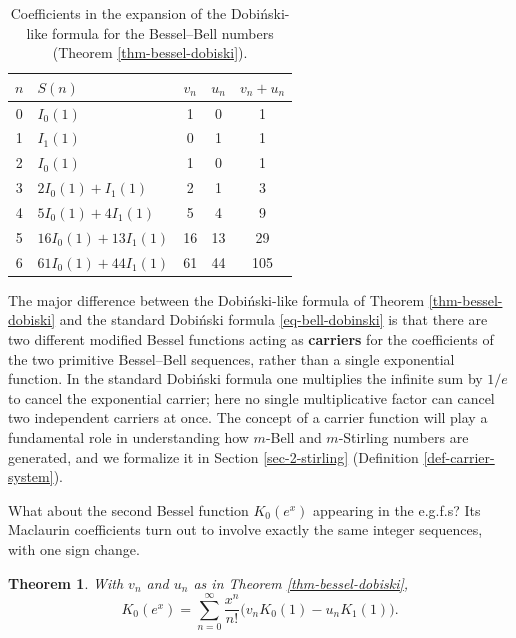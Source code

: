 \documentclass[a4paper]{amsart}
\numberwithin{equation}{section}
\newtheorem{theorem}{Theorem}[section]
\begin{document}
\begin{table}[htbp]
    \centering
        \begin{tabular}{|c|l|c|c|c|}
        \hline
        $n$ & $S(n)$                & $v_n$ & $u_n$ & $v_n+u_n$ \\
        \hline
        0   & $I_0(1)$              & 1     & 0     & 1         \\
        1   & $I_1(1)$              & 0     & 1     & 1         \\
        2   & $I_0(1)$              & 1     & 0     & 1         \\
        3   & $2I_0(1)+I_1(1)$    & 2     & 1     & 3         \\
        4   & $5I_0(1)+4I_1(1)$   & 5     & 4     & 9         \\
        5   & $16I_0(1)+13I_1(1)$ & 16    & 13    & 29        \\
        6   & $61I_0(1)+44I_1(1)$ & 61    & 44 &    105 \\
        \hline
        \end{tabular}
        \bigskip
    \caption{Coefficients in the expansion of the Dobi\'nski-like formula for the Bessel--Bell numbers (Theorem \ref{thm-bessel-dobiski}).}
    \label{tab-vn-un-coefs}
\end{table}

The major difference between the Dobi\'nski-like formula of Theorem \ref{thm-bessel-dobiski} and the standard Dobi\'nski formula \eqref{eq-bell-dobinski} is that there are two different modified Bessel functions acting as \textbf{carriers} for the coefficients of the two primitive Bessel--Bell sequences, rather than a single exponential function. In the standard Dobi\'nski formula one multiplies the infinite sum by $1/e$ to cancel the exponential carrier; here no single multiplicative factor can cancel two independent carriers at once. The concept of a carrier function will play a fundamental role in understanding how $m$-Bell and $m$-Stirling numbers are generated, and we formalize it in Section \ref{sec-2-stirling} (Definition \ref{def-carrier-system}).

What about the second Bessel function $K_0(e^x)$ appearing in the e.g.f.s? Its Maclaurin coefficients turn out to involve exactly the same integer sequences, with one sign change.

\begin{theorem}\label{thm-besselk-dobinski}
With $v_n$ and $u_n$ as in Theorem \ref{thm-bessel-dobiski},
%
\[
K_0(e^x) = \sum_{n=0}^\infty \frac{x^n}{n!}\big(v_n K_0(1) - u_n K_1(1)\big).
\]
%
\end{theorem}
\end{document}
